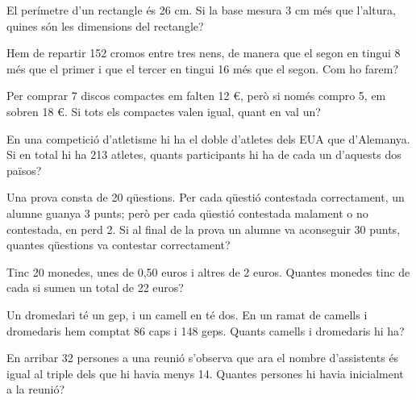 \begin{mylist}
 
\exer  El perímetre d'un rectangle és 26 cm. Si la base mesura 3 cm més que l'altura, quines són les dimensions del rectangle? 


\exer  Hem de repartir 152 cromos entre tres nens, de manera que el segon en tingui 8 més que el primer i que el tercer en tingui 16 més que el segon. Com ho farem? 


\exer[1] Per comprar 7 discos compactes em falten 12 €, però si només compro 5, em sobren 18 €. Si tots els compactes valen igual, quant en val un? 

\exer  En una competició d'atletisme hi ha el doble d'atletes dels EUA que d'Alemanya. Si en total hi ha 213 atletes, quants participants hi ha de cada un d'aquests dos països? 

\exer[1]  Una prova consta de 20 qüestions. Per cada qüestió contestada correctament, un alumne guanya 3 punts; però per cada qüestió contestada malament o no contestada, en perd 2. Si al final de la prova un alumne va aconseguir 30 punts, quantes qüestions va contestar correctament?

\exer[1]  Tinc 20 monedes, unes de 0,50 euros i altres de 2 euros. Quantes monedes tinc de cada si sumen un total de 22 euros?

\exer[1] Un dromedari té un gep, i un camell en té dos. En un ramat de camells i dromedaris hem comptat 86 caps i 148 geps. Quants camells i dromedaris hi ha? 

\exer[1]  En arribar 32 persones a una reunió s'observa que ara el nombre d'assistents és igual al triple dels que hi havia menys 14. Quantes persones hi havia inicialment a la reunió? 

\end{mylist}


